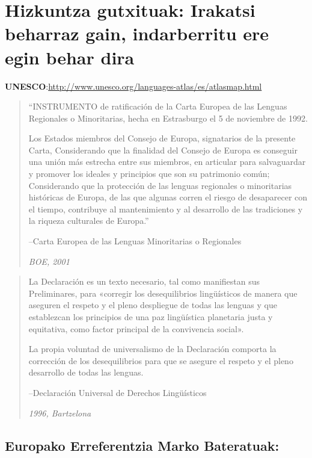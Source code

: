 \documentclass[]{book}
\begin{document}
\hypertarget{hizkuntza-gutxituak-irakatsi-beharraz-gain-indarberritu-ere-egin-behar-dira}{%
\section{Hizkuntza gutxituak: Irakatsi beharraz gain, indarberritu ere egin behar dira}\label{hizkuntza-gutxituak-irakatsi-beharraz-gain-indarberritu-ere-egin-behar-dira}}

\textbf{UNESCO}:\url{http://www.unesco.org/languages-atlas/es/atlasmap.html}

\begin{quote}
``INSTRUMENTO de ratificación de la Carta Europea de las Lenguas Regionales o Minoritarias, hecha en Estrasburgo el 5 de noviembre de 1992.

Los Estados miembros del Consejo de Europa, signatarios de la presente Carta, Considerando que la finalidad del Consejo de Europa es conseguir una unión más estrecha entre sus miembros, en articular para salvaguardar y promover los ideales y principios que son su patrimonio común; Considerando que la protección de las lenguas regionales o minoritarias históricas de Europa, de las que algunas corren el riesgo de desaparecer con el tiempo, contribuye al mantenimiento y al desarrollo de las tradiciones y la riqueza culturales de Europa.''

--Carta Europea de las Lenguas Minoritarias o Regionales

\emph{BOE, 2001}
\end{quote}

\begin{quote}
La Declaración es un texto necesario, tal como manifiestan sus Preliminares, para «corregir los desequilibrios lingüísticos de manera que aseguren el respeto y el pleno despliegue de todas las lenguas y que establezcan los principios de una paz lingüística planetaria justa y equitativa, como factor principal de la convivencia social».

La propia voluntad de universalismo de la Declaración comporta la corrección de los desequilibrios para que se asegure el respeto y el pleno desarrollo de todas las lenguas.

--Declaración Universal de Derechos Lingüísticos

\emph{1996, Bartzelona}
\end{quote}

\hypertarget{europako-erreferentzia-marko-bateratuak}{%
\subsection{Europako Erreferentzia Marko Bateratuak:}\label{europako-erreferentzia-marko-bateratuak}}
\end{document}
